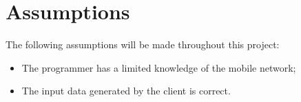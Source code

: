 \section{Assumptions}
The following assumptions will be made throughout this project:
\begin{itemize}
  \item The programmer has a limited knowledge of the mobile network;
  \item The input data generated by the client is correct.
\end{itemize}
